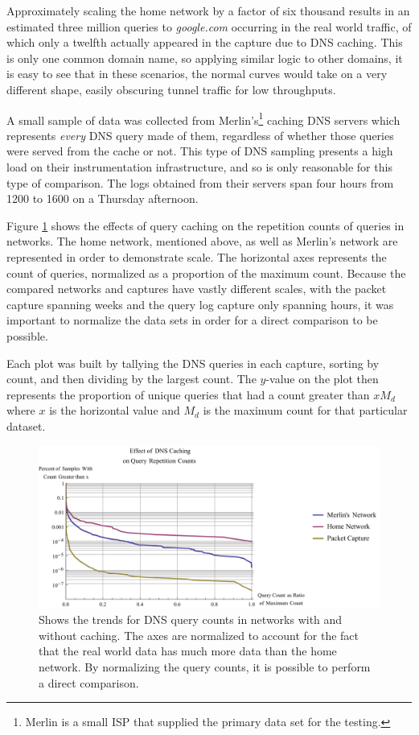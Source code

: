 \documentclass{llncs}
\begin{document}
Approximately scaling the home network by a factor of six thousand results in an
estimated three million queries to \emph{google.com} occurring in the real world
traffic, of which only a twelfth actually appeared in the capture due to
DNS caching. This is only one common domain name, so applying similar logic to
other domains, it is easy to see that in these scenarios, the normal curves
would take on a very different shape, easily obscuring tunnel traffic for low
throughputs.

A small sample of data was collected from Merlin's\footnote{Merlin is a small ISP that supplied the primary data set for the testing.} caching DNS servers which
represents \emph{every} DNS query made of them, regardless of whether those
queries were served from the cache or not. This type of DNS sampling presents a
high load on their instrumentation infrastructure, and so is only reasonable for
this type of comparison. The logs obtained from their servers span four hours
from 1200 to 1600 on a Thursday afternoon.

Figure \ref{caching} shows the effects of query caching on the repetition counts
of queries in networks. The home network, mentioned above, as well as Merlin's
network are represented in order to demonstrate scale. The horizontal axes
represents the count of queries, normalized as a proportion of the maximum
count. Because the compared networks and captures have vastly different scales,
with the packet capture spanning weeks and the query log capture only spanning
hours, it was important to normalize the data sets in order for a direct
comparison to be possible.

Each plot was built by tallying the DNS queries in each capture, sorting by
count, and then dividing by the largest count. The $y$-value on the plot then
represents the proportion of unique queries that had a count greater than $xM_d$
where $x$ is the horizontal value and $M_d$ is the maximum count for that particular
dataset.

\begin{figure}[h]
\centering
\includegraphics[width=\textwidth]{../figures/caching.pdf}
\caption[Effect of DNS Caching on Query Counts]{Shows the trends for DNS query
counts in networks with and without caching. The axes are normalized to account
for the fact that the real world data has much more data than the home network.
By normalizing the query counts, it is possible to perform a direct comparison.}
\label{caching}
\end{figure}
\end{document}
